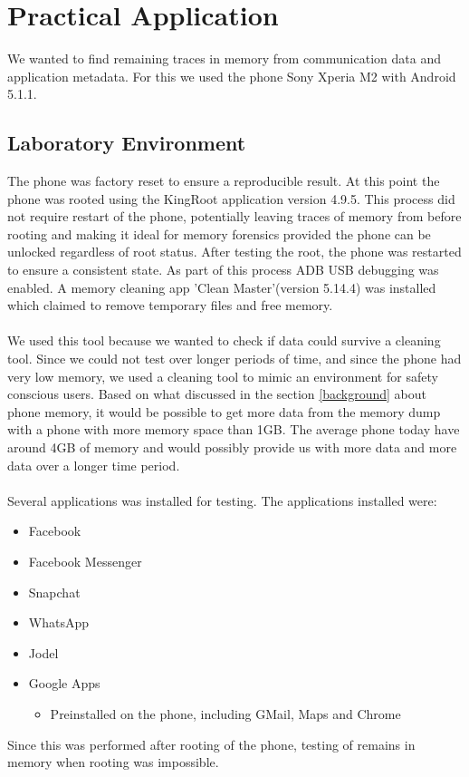 \section{Practical Application}
We wanted to find remaining traces in memory from communication data and application metadata. For this we used the phone Sony Xperia M2 with Android 5.1.1.

\subsection{Laboratory Environment}
The phone was factory reset to ensure a reproducible result. At this point the phone was rooted %
using the KingRoot application version 4.9.5. This process did not require restart of the phone, potentially leaving traces of memory from before rooting and making it ideal for memory forensics provided the phone can be unlocked regardless of root status. After testing the root, the phone was restarted to ensure a consistent state. As part of this process ADB USB debugging was enabled. A memory cleaning app 'Clean Master'(version 5.14.4) was installed which claimed to remove temporary files and free memory.\\\\ %
We used this tool because we wanted to check if data could survive a cleaning tool. Since we could not test over longer periods of time, and since the phone had very low memory, we used a cleaning tool to mimic an environment for safety conscious users. Based on what discussed in the section \ref{background} about phone memory, it would be possible to get more data from the memory dump with a phone with more memory space than 1GB. The average phone today have around 4GB of memory and would possibly provide us with more data and more data over a longer time period.\\\\Several applications was installed for testing. The applications installed were:
\begin{description}
\begin{itemize}
\item{Facebook}
\item{Facebook Messenger}
\item{Snapchat}
\item{WhatsApp}
\item{Jodel}
\item{Google Apps}
\begin{itemize}
\item{Preinstalled on the phone, including GMail, Maps and Chrome}
\end{itemize}
\end{itemize}
\end{description}
Since this was performed after rooting of the phone, testing of remains in memory when rooting was impossible.

